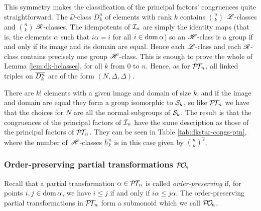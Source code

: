 This symmetry makes the classification of the principal factors' congruences
quite straightforward.  The $\DD$-class $D_k^n$ of elements with rank $k$
contains $\binom{n}{k}$ $\mathrel{\mathscr{L}}$-classes and $\binom{n}{k}$ $\mathrel{\mathscr{R}}$-classes.  The
idempotents of $\mathcal{I}_n$ are simply the identity maps (that is, the elements
$\alpha$ such that $i\alpha = i$ for all $i \in \operatorname{dom}\alpha$) so an $\mathrel{\mathscr{H}}$-class
is a group if and only if its image and its domain are equal.  Hence each
$\mathrel{\mathscr{L}}$-class and each $\mathrel{\mathscr{R}}$-class contains precisely one group $\mathrel{\mathscr{H}}$-class.  This
is enough to prove the whole of Lemma \ref{lem:dk-hclasses}, for all $k$ from
$0$ to $n$.  Hence, as for $\mathcal{P\!T\!}_n$, all linked triples on $\overline{D_k^n}$ are of
the form $(N, \Delta, \Delta)$.

There are $k!$ elements with a given image and domain of size $k$, and if the
image and domain are equal they form a group isomorphic to $\mathcal{S}_k$, so like
$\mathcal{P\!T\!}_n$ we have that the choices for $N$ are all the normal subgroups of
$\mathcal{S}_k$.  The result is that the congruences of the principal factors of $\mathcal{I}_n$
have the same description as those of the principal factors of $\mathcal{P\!T\!}_n$.  They
can be seen in Table \ref{tab:dkstar-congs-ptn}, where the number of
$\mathrel{\mathscr{H}}$-classes $h_k^n$ is in this case given by $\binom{n}{k}^2$.

\subsubsection{Order-preserving partial transformations $\mathcal{P\!O\!}_n$}
\label{sec:princfact-on}
Recall that a partial transformation $\alpha \in \mathcal{P\!T\!}_n$ is called
\textit{order-preserving} if, for points $i,j \in \operatorname{dom}\alpha$, we have
$i \leq j$ if and only if $i\alpha \leq j\alpha$.  The order-preserving partial
transformations in $\mathcal{P\!T\!}_n$ form a submonoid which we call $\mathcal{P\!O\!}_n$.

